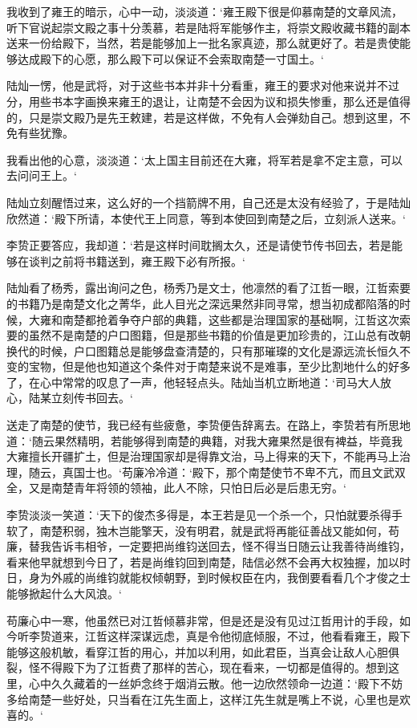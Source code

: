 我收到了雍王的暗示，心中一动，淡淡道：‘雍王殿下很是仰慕南楚的文章风流，听下官说起崇文殿之事十分羡慕，若是陆将军能够作主，将崇文殿收藏书籍的副本送来一份给殿下，当然，若是能够加上一批名家真迹，那么就更好了。若是贵使能够达成殿下的心愿，那么殿下可以保证不会索取南楚一寸国土。‘

陆灿一愣，他是武将，对于这些书本并非十分看重，雍王的要求对他来说并不过分，用些书本字画换来雍王的退让，让南楚不会因为议和损失惨重，那么还是值得的，只是崇文殿乃是先王敕建，若是这样做，不免有人会弹劾自己。想到这里，不免有些犹豫。

我看出他的心意，淡淡道：‘太上国主目前还在大雍，将军若是拿不定主意，可以去问问王上。‘

陆灿立刻醒悟过来，这么好的一个挡箭牌不用，自己还是太没有经验了，于是陆灿欣然道：‘殿下所请，本使代王上同意，等到本使回到南楚之后，立刻派人送来。‘

李贽正要答应，我却道：‘若是这样时间耽搁太久，还是请使节传书回去，若是能够在谈判之前将书籍送到，雍王殿下必有所报。‘

陆灿看了杨秀，露出询问之色，杨秀乃是文士，他凛然的看了江哲一眼，江哲索要的书籍乃是南楚文化之菁华，此人目光之深远果然非同寻常，想当初成都陷落的时候，大雍和南楚都抢着争夺户部的典籍，这些都是治理国家的基础啊，江哲这次索要的虽然不是南楚的户口图籍，但是那些书籍的价值是更加珍贵的，江山总有改朝换代的时候，户口图籍总是能够盘查清楚的，只有那璀璨的文化是源远流长恒久不变的宝物，但是他也知道这个条件对于南楚来说不是难事，至少比割地什么的好多了，在心中常常的叹息了一声，他轻轻点头。陆灿当机立断地道：‘司马大人放心，陆某立刻传书回去。‘

送走了南楚的使节，我已经有些疲惫，李贽便告辞离去。在路上，李贽若有所思地道：‘随云果然精明，若能够得到南楚的典籍，对我大雍果然是很有裨益，毕竟我大雍擅长开疆扩土，但是治理国家却是得靠文治，马上得来的天下，不能再马上治理，随云，真国士也。‘苟廉冷冷道：‘殿下，那个南楚使节不卑不亢，而且文武双全，又是南楚青年将领的领袖，此人不除，只怕日后必是后患无穷。‘

李贽淡淡一笑道：‘天下的俊杰多得是，本王若是见一个杀一个，只怕就要杀得手软了，南楚积弱，独木岂能擎天，没有明君，就是武将再能征善战又能如何，苟廉，替我告诉韦相爷，一定要把尚维钧送回去，怪不得当日随云让我善待尚维钧，看来他早就想到今日了，若是尚维钧回到南楚，陆信必然不会再大权独握，加以时日，身为外戚的尚维钧就能权倾朝野，到时候权臣在内，我倒要看看几个才俊之士能够掀起什么大风浪。‘

苟廉心中一寒，他虽然已对江哲倾慕非常，但是还是没有见过江哲用计的手段，如今听李贽道来，江哲这样深谋远虑，真是令他彻底倾服，不过，他看看雍王，殿下能够这般机敏，看穿江哲的用心，并加以利用，如此君臣，当真会让敌人心胆俱裂，怪不得殿下为了江哲费了那样的苦心，现在看来，一切都是值得的。想到这里，心中久久藏着的一丝妒念终于烟消云散。他一边欣然领命一边道：‘殿下不妨多给南楚一些好处，只当看在江先生面上，这样江先生就是嘴上不说，心里也是欢喜的。‘

